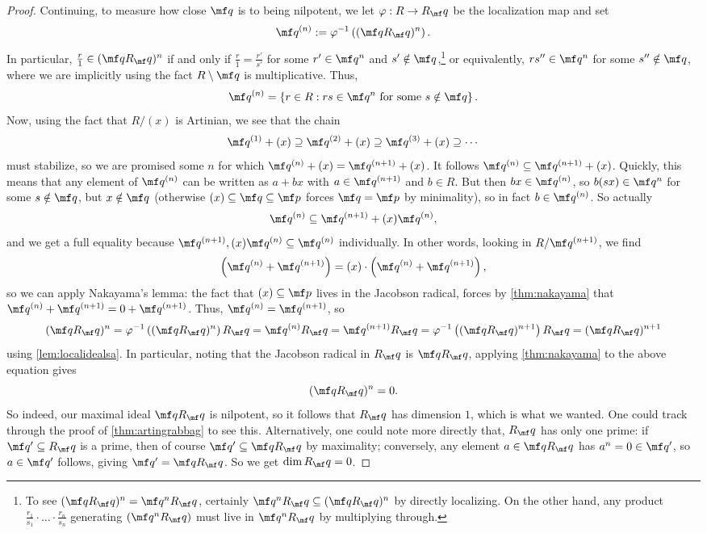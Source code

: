 \begin{proof}
	Continuing, to measure how close $\mf q$ is to being nilpotent, we let $\varphi:R\to R_\mf q$ be the localization map and set
	\[\mf q^{(n)}:=\varphi^{-1}\left((\mf qR_\mf q)^n\right).\]
	In particular, $\frac r1\in(\mf qR_\mf q)^n$ if and only if $\frac r1=\frac{r'}{s'}$ for some $r'\in\mf q^n$ and $s'\notin\mf q$,\footnote{To see $(\mf qR_\mf q)^n=\mf q^nR_\mf q$, certainly $\mf q^nR_\mf q\subseteq(\mf qR_\mf q)^n$ by directly localizing. On the other hand, any product $\frac{r_1}{s_1}\cdot\ldots\cdot\frac{r_n}{s_n}$ generating $(\mf q^nR_\mf q)$ must live in $\mf q^nR_\mf q$ by multiplying through.} or equivalently, $rs''\in\mf q^n$ for some $s''\notin\mf q$, where we are implicitly using the fact $R\setminus\mf q$ is multiplicative. Thus,
	\[\mf q^{(n)}=\left\{r\in R:rs\in\mf q^n\text{ for some }s\notin\mf q\right\}.\]
	Now, using the fact that $R/(x)$ is Artinian, we see that the chain
	\[\mf q^{(1)}+(x)\supseteq\mf q^{(2)}+(x)\supseteq\mf q^{(3)}+(x)\supseteq\cdots\]
	must stabilize, so we are promised some $n$ for which $\mf q^{(n)}+(x)=\mf q^{(n+1)}+(x)$. It follows $\mf q^{(n)}\subseteq\mf q^{(n+1)}+(x)$. Quickly, this means that any element of $\mf q^{(n)}$ can be written as $a+bx$ with $a\in\mf q^{(n+1)}$ and $b\in R$. But then $bx\in\mf q^{(n)}$, so $b(sx)\in\mf q^n$ for some $s\notin\mf q$, but $x\notin\mf q$ (otherwise $(x)\subseteq\mf q\subseteq\mf p$ forces $\mf q=\mf p$ by minimality), so in fact $b\in\mf q^{(n)}$. So actually
	\[\mf q^{(n)}\subseteq\mf q^{(n+1)}+(x)\mf q^{(n)},\]
	and we get a full equality because $\mf q^{(n+1)},(x)\mf q^{(n)}\subseteq\mf q^{(n)}$ individually. In other words, looking in $R/\mf q^{(n+1)}$, we find
	\[\left(\mf q^{(n)}+\mf q^{(n+1)}\right)=(x)\cdot\left(\mf q^{(n)}+\mf q^{(n+1)}\right),\]
	so we can apply Nakayama's lemma: the fact that $(x)\subseteq\mf p$ lives in the Jacobson radical, forces by \autoref{thm:nakayama} that $\mf q^{(n)}+\mf q^{(n+1)}=0+\mf q^{(n+1)}$. Thus, $\mf q^{(n)}=\mf q^{(n+1)}$, so
	\[(\mf qR_\mf q)^n=\varphi^{-1}\left((\mf qR_\mf q)^n\right)R_\mf q=\mf q^{(n)}R_\mf q=\mf q^{(n+1)}R_\mf q=\varphi^{-1}\left((\mf qR_\mf q)^{n+1}\right)R_\mf q=(\mf qR_\mf q)^{n+1}\]
	using \autoref{lem:localidealsa}. In particular, noting that the Jacobson radical in $R_\mf q$ is $\mf qR_\mf q$, applying \autoref{thm:nakayama} to the above equation gives
	\[(\mf qR_\mf q)^n=0.\]
	So indeed, our maximal ideal $\mf qR_\mf q$ is nilpotent, so it follows that $R_\mf q$ has dimension $1$, which is what we wanted. One could track through the proof of \autoref{thm:artingrabbag} to see this. Alternatively, one could note more directly that, $R_\mf q$ has only one prime: if $\mf q'\subseteq R_\mf q$ is a prime, then of course $\mf q'\subseteq\mf qR_\mf q$ by maximality; conversely, any element $a\in\mf qR_\mf q$ has $a^n=0\in\mf q'$, so $a\in\mf q'$ follows, giving $\mf q'=\mf qR_\mf q$. So we get $\dim R_\mf q=0$.
\end{proof}
